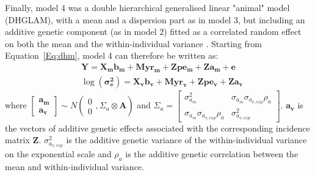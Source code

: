 \documentclass[a4paper,12pt,twoside]{article}
\begin{document}
	Finally, model 4 was a double hierarchical generalised linear "animal" model (DHGLAM), with a mean and a dispersion part as in model 3, but including an additive genetic component (as in model 2) fitted as a correlated random effect on both the mean and the within-individual variance \citep{Felleki2012}.
	Starting from Equation~\ref{Eq:dhm}, model 4 can therefore be written as:
	\begin{equation}\label{Eq:dham}
		\begin{aligned}
			&\boldsymbol{Y} = \boldsymbol{X_m b_m} + \boldsymbol{M yr_m} + \boldsymbol{Z pe_m} + \boldsymbol{Z a_m} + \boldsymbol{e}\\
			&\log (\boldsymbol{\sigma_e^2}) = \boldsymbol{X_v b_v} + \boldsymbol{M yr_v} + \boldsymbol{Z pe_v} + \boldsymbol{Z a_v}
		\end{aligned}
	\end{equation}
	where 
	$\begin{bmatrix}
		\boldsymbol{a_m} \\
		\boldsymbol{a_v}
	\end{bmatrix}
	\sim N \left(\begin{matrix} 0 \\ 0 \end{matrix}, \Sigma_a \otimes \boldsymbol{A} \right)
	$
	and $\Sigma_a =
	\begin{bmatrix}
		\sigma_{a_m}^2 & \sigma_{a_m}\sigma_{a_{v,exp}}\rho_{a} \\
		\sigma_{a_m}\sigma_{a_{v,exp}}\rho_{a} & \sigma_{a_{v,exp}}^2 
	\end{bmatrix}$.
	$\boldsymbol{a_v}$ is the vectors of additive genetic effects associated with the corresponding incidence matrix $\boldsymbol{Z}$. 
	$\sigma_{a_{v,exp}}^2$ is the additive genetic variance of the within-individual variance on the exponential scale and $\rho_{a}$ is the additive genetic correlation between the mean and within-individual variance.
	
\end{document}
